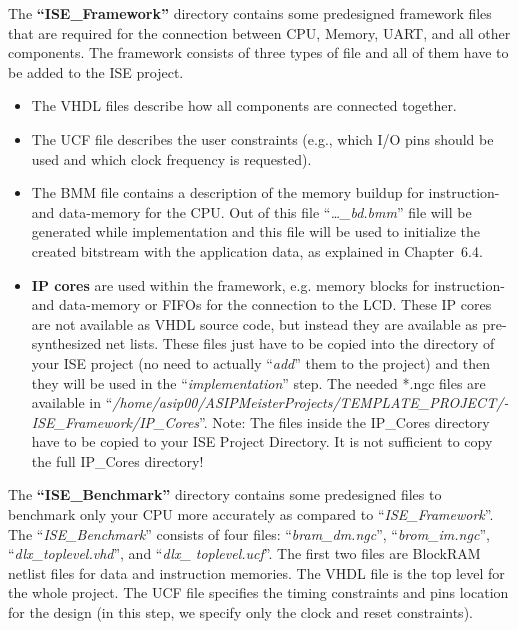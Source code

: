 \documentclass[
]{article}
\begin{document}
The \textbf{``}\textbf{ISE\_}\textbf{Framework''} directory contains
some predesigned framework files that are required for the connection
between CPU, Memory, UART, and all other components. The framework
consists of three types of file and all of them have to be added to the
ISE project.

\begin{itemize}
\item
  The VHDL files describe how all components are connected together.
\item
  The UCF file describes the user constraints (e.g., which I/O pins
  should be used and which clock frequency is requested).
\item
  The BMM file contains a description of the memory buildup for
  instruction- and data-memory for the CPU. Out of this file
  ``\emph{\ldots\_bd.bmm}'' file will be generated while implementation
  and this file will be used to initialize the created bitstream with
  the application data, as explained in Chapter~6.4.
\item
  \textbf{IP cores} are used within the framework, e.g. memory blocks
  for instruction- and data-memory or FIFOs for the connection to the
  LCD. These IP cores are not available as VHDL source code, but instead
  they are available as pre-synthesized net lists. These files just have
  to be copied into the directory of your ISE project (no need to
  actually ``\emph{add}'' them to the project) and then they will be
  used in the ``\emph{implementation}'' step. The needed *.ngc files are
  available in
  ``\emph{/home/asip00/­ASIPMeisterProjects/­TEMPLATE\_PROJECT/­ISE\_Framework/­IP\_­Cores}''.
  Note: The files {inside} the IP\_Cores directory have to be copied to
  your ISE Project Directory. It is not sufficient to copy the full
  IP\_Cores directory!
\end{itemize}

The \textbf{``ISE\_}\textbf{Benchmark''} directory contains some
predesigned files to benchmark only your CPU more accurately as compared
to ``\emph{ISE\_Framework}''. The ``\emph{ISE\_Benchmark}'' consists of
four files: ``\emph{bram\_dm.ngc}'', ``\emph{brom\_im.ngc}'',
``\emph{dlx\_}\emph{toplevel.vhd}'', and ``\emph{dlx\_ toplevel.ucf}''.
The first two files are BlockRAM netlist files for data and instruction
memories. The VHDL file is the top level for the whole project. The UCF
file specifies the timing constraints and pins location for the design
(in this step, we specify only the clock and reset constraints).
\end{document}
